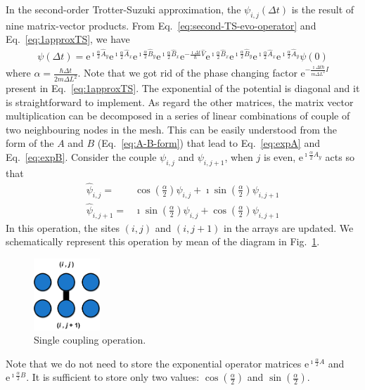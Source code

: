 In the second-order Trotter-Suzuki approximation, the $\psi_{i,j}(\Delta t)$ is the result of nine matrix-vector products. From Eq.~\eqref{eq:second-TS-evo-operator} and Eq.~\eqref{eq:1approxTS}, we have
\begin{align} \label{eq:single-iteration}
\psi(\Delta t) = \mathrm{e}^{\imath \frac{\alpha}{2} \hat{A}_y} \mathrm{e}^{\imath \frac{\alpha}{2} \hat{A}_x}   \mathrm{e}^{\imath \frac{\alpha}{2} \hat{B}_y} \mathrm{e}^{\imath \frac{\alpha}{2} \hat{B}_x}  \mathrm{e}^{-\frac{\imath \Delta t}{\hbar}\hat{V}} \mathrm{e}^{\imath \frac{\alpha}{2} \hat{B}_x} \mathrm{e}^{\imath \frac{\alpha}{2} \hat{B}_y} \mathrm{e}^{\imath \frac{\alpha}{2} \hat{A}_x} \mathrm{e}^{\imath \frac{\alpha}{2} \hat{A}_y} \psi(0)
\end{align}
where $\alpha = \frac{\hbar \Delta t}{2m\Delta L^2}$. Note that we got rid of the phase changing factor $\mathrm{e}^{-\frac{\imath \Delta t \hbar}{m \Delta L^2} I}$ present in Eq.~\eqref{eq:1approxTS}. The exponential of the potential is diagonal and it is straightforward to implement. As regard the other matrices, the matrix vector multiplication can be decomposed in a series of linear combinations of couple of two neighbouring nodes in the mesh. This can be easily understood from the form of the $A$ and $B$ (Eq.~\eqref{eq:A-B-form}) that lead to Eq.~\eqref{eq:expA} and Eq.~\eqref{eq:expB}. Consider the couple $\psi_{i,j}$ and $\psi_{i,j+1}$, when $j$ is even, $\mathrm{e}^{\imath \frac{\alpha}{2} A_y}$ acts so that
\begin{align}
\hat{\psi}_{i,j} = & \cos\left(\frac{\alpha}{2}\right) \psi_{i,j} + \imath \sin\left(\frac{\alpha}{2}\right) \psi_{i,j+1} \\
\hat{\psi}_{i,j+1} = & \imath\sin\left(\frac{\alpha}{2}\right) \psi_{i,j} + \cos\left(\frac{\alpha}{2}\right) \psi_{i,j+1} 
\end{align}
In this operation, the sites $(i,j)$ and $(i,j+1)$ in the arrays are updated. We schematically represent this operation by mean of the diagram in Fig.~\ref{fig:scheme-single-iteration}.
\begin{figure}
   \centering
   \includegraphics[width=2.5cm]{Figs/Single_couple.png}
   \caption{Single coupling operation.} \label{fig:scheme-single-iteration}
\end{figure}
Note that we do not need to store the exponential operator matrices $\mathrm{e}^{\imath \frac{\alpha}{2} A}$ and $\mathrm{e}^{\imath \frac{\alpha}{2} B}$. It is sufficient to store only two values: $ \cos\left(\frac{\alpha}{2}\right)$ and $\sin\left(\frac{\alpha}{2}\right)$.

